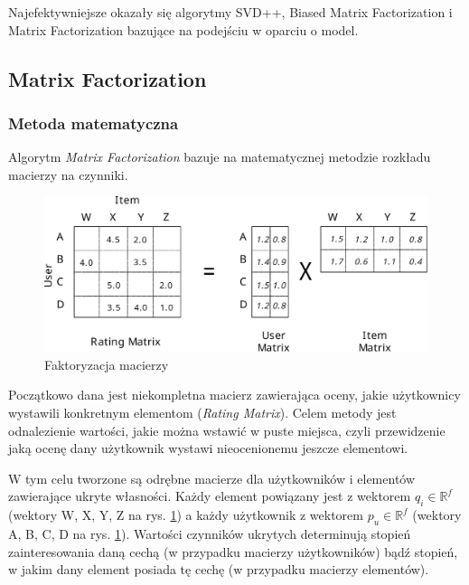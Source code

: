 \documentclass[twoside]{iisthesis}
\begin{document}
		 Najefektywniejsze okazały się algorytmy SVD++, Biased Matrix Factorization i Matrix Factorization bazujące na podejściu w oparciu o model. 
	 	 
		 \subsection{Matrix Factorization}
		
		 \subsubsection{Metoda matematyczna}	
	
		 Algorytm \textit{Matrix Factorization} bazuje na matematycznej metodzie rozkładu macierzy na czynniki.
	
	
			  \begin{figure}[!ht] 
			  	\centering
			  	\includegraphics[width=1\textwidth]{factorization}
			  	\caption{Faktoryzacja macierzy \protect\cite{id:ComputingRecommendationsExtremeScaleApacheFlink}}
			  	\label{fig:factorization}
			  \end{figure}
			 
		Początkowo dana jest niekompletna macierz zawierająca oceny, jakie użytkownicy wystawili konkretnym elementom (\textit{Rating Matrix}). Celem metody jest odnalezienie wartości, jakie można wstawić w puste miejsca, czyli przewidzenie jaką ocenę dany użytkownik wystawi nieocenionemu jeszcze elementowi. 		
		
		W tym celu tworzone są odrębne macierze dla użytkowników i elementów zawierające ukryte własności. Każdy element powiązany jest z wektorem $q_i \in \mathbb{R} ^f$ (wektory W, X, Y, Z na rys. \ref{fig:factorization}) a każdy użytkownik z wektorem $p_u \in \mathbb{R} ^f$ (wektory A, B, C, D na rys. \ref{fig:factorization}). Wartości czynników ukrytych determinują stopień zainteresowania daną cechą (w przypadku macierzy użytkowników) bądź stopień, w jakim dany element posiada tę cechę (w przypadku macierzy elementów).		
		
\end{document}
